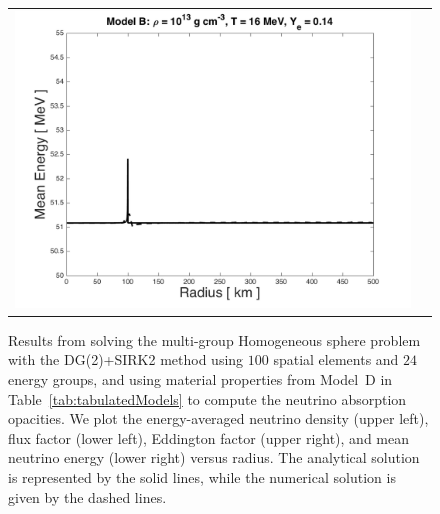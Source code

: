 \documentclass[10pt,preprint]{aastex}
\begin{document}
\begin{figure}
\begin{center}
\begin{tabular}{cc}
      \includegraphics[scale=0.4]{./Figures/HomogeneousSphereTable_B_MeanEnergy}
    \end{tabular}
  \end{center}
  \caption{Results from solving the multi-group Homogeneous sphere problem with the DG(2)+SIRK2 method using $100$ spatial elements and $24$ energy groups, and using material properties from Model~D in Table~\ref{tab:tabulatedModels} to compute the neutrino absorption opacities.
    We plot the energy-averaged neutrino density (upper left), flux factor (lower left), Eddington factor (upper right), and mean neutrino energy (lower right) versus radius.  
    The analytical solution is represented by the solid lines, while the numerical solution is given by the dashed lines.}
  \label{fig:homogeneousSphere1D_weaklib_B}
\end{figure}
\end{document}
